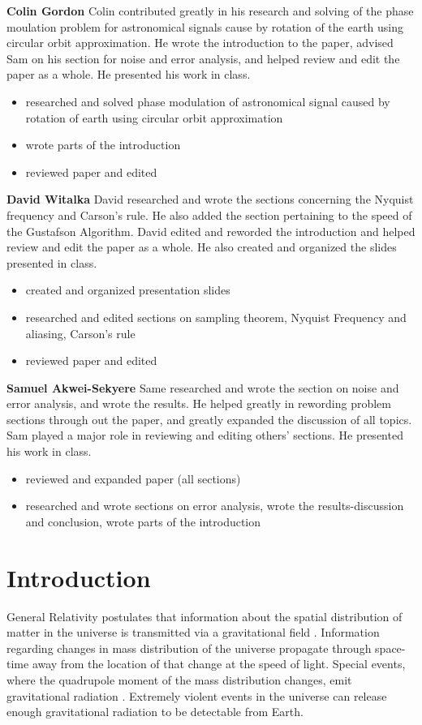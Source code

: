 \documentclass[onecolumn, groupedaddress, 10pt]{revtex4-1}
\begin{document}
\textbf{Colin Gordon}
Colin contributed greatly in his research and solving of the phase moulation problem for astronomical signals cause by rotation of the earth using circular orbit approximation. He wrote the introduction to the paper, advised Sam on his section for noise and error analysis, and helped review and edit the paper as a whole. He presented his work in class.
\begin{itemize}
\item researched and solved phase modulation of astronomical signal caused by rotation of earth using circular orbit approximation
\item wrote parts of the introduction
\item reviewed paper and edited
\end{itemize}

\textbf{David Witalka}
David researched and wrote the sections concerning the Nyquist frequency and Carson's rule. He also added the section pertaining to the speed of the Gustafson Algorithm. David edited and reworded the introduction and helped review and edit the paper as a whole. He also created and organized the slides presented in class.
\begin{itemize}
\item created and organized presentation slides
\item researched and edited sections on sampling theorem, Nyquist Frequency and aliasing, Carson’s rule
\item reviewed paper and edited
\end{itemize}

\textbf{Samuel Akwei-Sekyere}
Same researched and wrote the section on noise and error analysis, and wrote the results. He helped greatly in rewording problem sections through out the paper, and greatly expanded the discussion of all topics. Sam played a major role in reviewing and editing others' sections. He presented his work in class.
\begin{itemize}
\item reviewed and expanded paper (all sections)
\item researched and wrote sections on error analysis,  wrote the results-discussion and conclusion, wrote parts of the introduction
\end{itemize}

\pagebreak


\section{Introduction}
General Relativity postulates that information about the spatial distribution of matter in the universe is transmitted via a gravitational field \cite{einstein1990gravitational}. Information regarding changes in mass distribution of the universe propagate through space-time away from the location of that change at the speed of light.  Special events, where the quadrupole moment of the mass distribution changes, emit gravitational radiation \cite{poisson1998gravitational}.  Extremely violent events in the universe can release enough gravitational radiation to be detectable from Earth.
\end{document}
